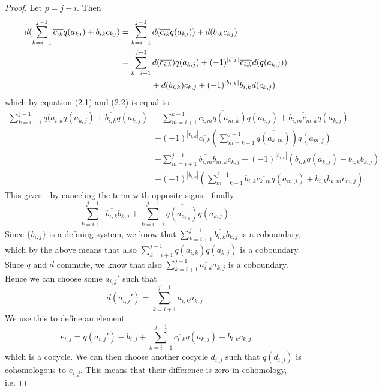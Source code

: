 \begin{proof}
Let $p = j-i$. Then 
\begin{align*}
    d(\sum_{k=i+1}^{j-1}\overline{c_{ik}}q(a_{kj})+b_{ik}c_{kj})
    &= \sum_{k=i+1}^{j-1}d(\overline{c_{ik}}q(a_{kj}))+d(b_{ik}c_{kj}) \\
    &= \sum_{k=i+1}^{j-1} d(\overline{c_{i,k}})q(a_{k,j}) + (-1)^{|\overline{c_{ik}}|}\overline{c_{i,k}}d(q(a_{k,j})) \\
    &\hspace{13mm}+ 
    d(b_{i,k})c_{k,j} + (-1)^{|b_{i,k}|}b_{i,k}d(c_{k,j})
\end{align*}
which by equation (2.1) and (2.2) is equal to  
\begin{align*}
\sum_{k=i+1}^{j-1} \overline{q(a_{i,k}}q(a_{k,j}) + \overline{b_{i,k}}q(a_{k,j})
    &+ 
    \sum_{m = i+1}^{k-1}\overline{c_{i,m}q(a_{m,k})}q(a_{k,j}) + \overline{b_{i,m}c_{m,k}}q(a_{k,j}) \\
    &+ 
    (-1)^{|\overline{c_{i,k}}|}\overline{c_{i,k}}(\sum_{m=k+1}^{j-1}\overline{q(a_{k,m})})q(a_{m,j}) \\
    &+ 
    \sum_{m=i+1}^{j-1}\overline{b_{i,m}}b_{m,k}c_{k,j} + (-1)^{|b_{i,k}|}(b_{i,k}q(a_{k,j}) - b_{i,k}b_{k,j}) \\
    &+ 
    (-1)^{|b_{i,k}|}(\sum_{m=k+1}^{j-1}b_{i,k}\overline{c_{k,m}}q(a_{m,j})+b_{i,k}b_{k,m}c_{m,j}).
\end{align*}
This gives---by canceling the term with opposite signs---finally
\begin{equation*}
\sum_{k=i+1}^{j-1}\overline{b_{i,k}}b_{k,j} + \sum_{k=i+1}^{j-1}\overline{q(a_{a_{i,k}})}q(a_{k,j}).
\end{equation*}
Since $\{b_{i,j}\}$ is a defining system, we know that $\sum_{k=i+1}^{j-1}\overline{b_{i,k}}b_{k,j}$ is a coboundary, which by the above means that also $\sum_{k=i+1}^{j-1}\overline{q(a_{i,k})}q(a_{k,j})$ is a coboundary. Since $q$ and $d$ commute, we know that also $\sum_{k=i+1}^{j-1}\overline{a_{i,k}}a_{k,j}$ is a coboundary. Hence we can choose some $a_{i,j}'$ such that
\begin{equation*}
    d(a_{i,j}') = \sum_{k=i+1}^{j-1}\overline{a_{i,k}}a_{k,j}.    
\end{equation*}
We use this to define an element 
\begin{equation*}
    e_{i,j} = q(a_{i,j}') - b_{i,j} + \sum_{k=i+1}^{j-1}\overline{c_{i,k}}q(a_{k,j})+b_{i,k}c_{k,j}
\end{equation*}
which is a cocycle. We can then choose another cocycle $d_{i,j}$ such that $q(d_{i,j})$ is cohomologous to $e_{i,j}$. This means that their difference is zero in cohomology, i.e. 

\end{proof}
